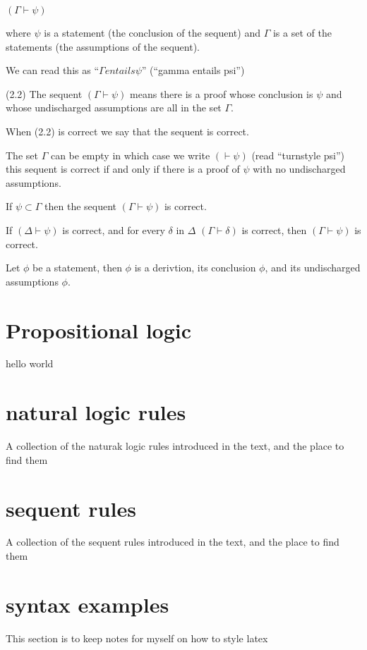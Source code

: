 \documentclass[a4paper, titlepage]{report}
\begin{document}
  $(\Gamma \vdash \psi)$

  where $\psi$ is a statement (the conclusion of the sequent) and $\Gamma$ is a set of the statements (the assumptions of the sequent).

  We can read this as  ``$\Gamma entails \psi$'' (``gamma entails psi'')

(2.2) The sequent $(\Gamma \vdash \psi)$ means
  there is a proof whose conclusion is $\psi$ and whose undischarged assumptions are all in the set $\Gamma$.

When (2.2) is correct we say that the sequent is correct.

The set $\Gamma$ can be empty in which case we write $(\vdash \psi)$ (read ``turnstyle psi'')
this sequent is correct if and only if there is a proof of $\psi$ with no undischarged assumptions.

\bigskip

  If $\psi \subset \Gamma$ then the sequent $(\Gamma \vdash \psi)$ is correct.

  If $(\Delta \vdash \psi)$ is correct,
  and for every $\delta$ in $\Delta$ $(\Gamma \vdash \delta)$ is correct,
  then $(\Gamma \vdash \psi)$ is correct.

  Let $\phi$ be a statement, then
    $\phi$
  is a derivtion, its conclusion $\phi$, and its undischarged assumptions $\phi$.



\chapter{Propositional logic}

hello world


\chapter{natural logic rules}
A collection of the naturak logic rules introduced in the text, and the place to find them

\chapter{sequent rules}
A collection of the sequent rules introduced in the text, and the place to find them

\chapter{syntax examples}
This section is to keep notes for myself on how to style latex
\end{document}
